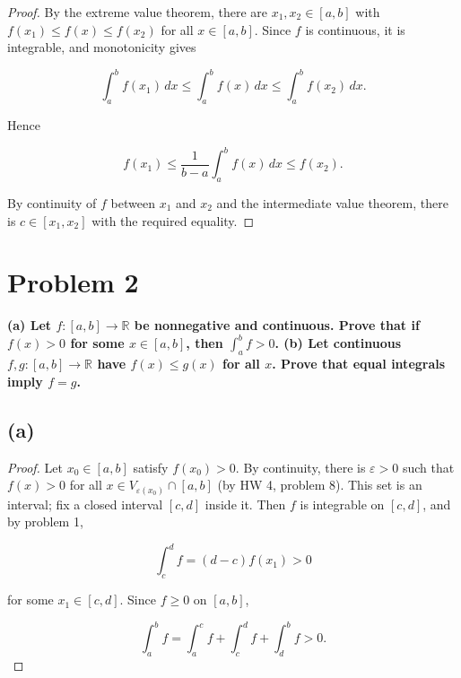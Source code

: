 \begin{proof}

By the extreme value theorem, there are \(x_{1},x_{2} \in \left\lbrack {a,b} \right\rbrack\) with \(f\left( x_{1} \right) \leq f(x) \leq f\left( x_{2} \right)\) for all \(x \in \left\lbrack {a,b} \right\rbrack\). Since \(f\) is continuous, it is integrable, and monotonicity gives

\[\int_{a}^{b}f\left( x_{1} \right)\, dx \leq \int_{a}^{b}f(x)\, dx \leq \int_{a}^{b}f\left( x_{2} \right)\, dx.\]

Hence

\[f\left( x_{1} \right) \leq \frac{1}{b - a}\int_{a}^{b}f(x)\, dx \leq f\left( x_{2} \right).\]

By continuity of \(f\) between \(x_{1}\) and \(x_{2}\) and the intermediate value theorem, there is \(c \in \left\lbrack {x_{1},x_{2}} \right\rbrack\) with the required equality.

\end{proof}

\section{Problem 2}

\textbf{(a) Let \(f:\left\lbrack {a,b} \right\rbrack\rightarrow\mathbb{R}\) be nonnegative and continuous. Prove that if \(f(x) > 0\) for some \(x \in \left\lbrack {a,b} \right\rbrack\), then \(\int_{a}^{b}f > 0\). (b) Let continuous \(f,g:\left\lbrack {a,b} \right\rbrack\rightarrow\mathbb{R}\) have \(f(x) \leq g(x)\) for all \(x\). Prove that equal integrals imply \(f = g\).}

\subsection{(a)}

\begin{proof}

Let \(x_{0} \in \left\lbrack {a,b} \right\rbrack\) satisfy \(f\left( x_{0} \right) > 0\). By continuity, there is \(\varepsilon > 0\) such that \(f(x) > 0\) for all \(x \in V_{\varepsilon{(x_{0})}} \cap \left\lbrack {a,b} \right\rbrack\) (by HW 4, problem 8). This set is an interval; fix a closed interval \(\left\lbrack {c,d} \right\rbrack\) inside it. Then \(f\) is integrable on \(\left\lbrack {c,d} \right\rbrack\), and by problem 1,

\[\int_{c}^{d}f = \left( {d - c} \right)f\left( x_{1} \right) > 0\]

for some \(x_{1} \in \left\lbrack {c,d} \right\rbrack\). Since \(f \geq 0\) on \(\left\lbrack {a,b} \right\rbrack\),

\[\int_{a}^{b}f = \int_{a}^{c}f + \int_{c}^{d}f + \int_{d}^{b}f > 0.\]

\end{proof}

